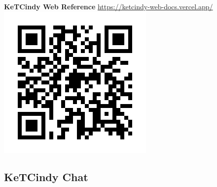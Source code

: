 \documentclass[dvipdfmx, unicode]{beamer}
\begin{document}
\begin{frame}[t]{\bfseries KeTCindy Web Reference}
  \url{https://ketcindy-web-docs.vercel.app/}
  \centering
  \includegraphics[scale=0.75]{img/Reference/Referece_QR.png}
\end{frame}

\subsection{KeTCindy Chat}
\end{document}
